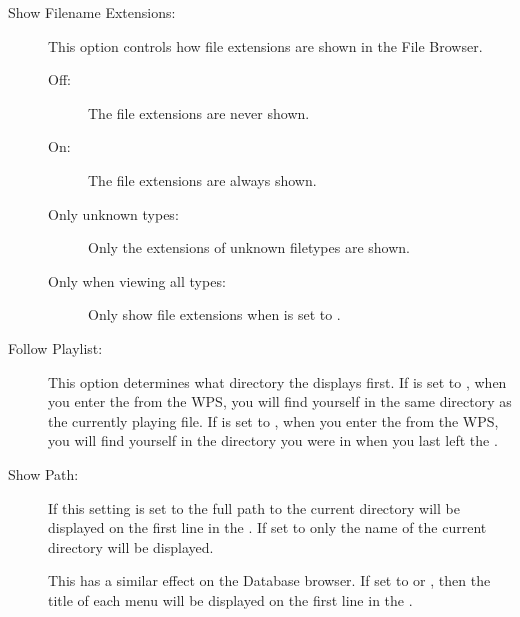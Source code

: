 \begin{description}
\item[\label{ref:ShowExtensions}Show Filename Extensions:]
  This option controls how file extensions are shown in the File Browser.
  \begin{description}
  \item[Off:] The file extensions are never shown.
  \item[On:] The file extensions are always shown.
  \item[Only unknown types:] Only the extensions of unknown filetypes are shown.
  \item[Only when viewing all types:] Only show file extensions when
       is set to .
  \end{description}
  
\item[Follow Playlist:] 
  This option determines what directory the  displays
  first. If  is set to , when you enter
  the  from the WPS, you will find yourself in the same
  directory as the currently playing file. If  is set
  to , when you enter the  from the WPS, you
  will find yourself in the directory you were in when you last left the
  .

\item[Show Path:]
  If this setting is set to  the full path to the current
  directory will be displayed on the first line in the .
  If set to  only the name of the current
  directory will be displayed.
  
  This has a similar effect on the Database browser. If set to
   or , then the title of
  each menu will be displayed on the first line in the .

\end{description}
